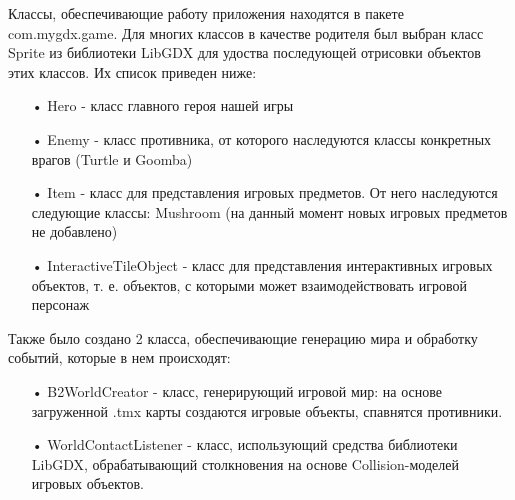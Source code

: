 Классы, обеспечивающие работу приложения находятся в пакете com.mygdx.game. Для многих классов в качестве родителя был выбран класс Sprite из библиотеки LibGDX для удоства последующей отрисовки объектов этих классов. Их список приведен ниже:
\begin{enumerate}
\item[•] Hero - класс главного героя нашей игры
\item[•] Enemy - класс противника, от которого наследуются классы конкретных врагов (Turtle и Goomba)
\item[•] Item - класс для представления игровых предметов. От него наследуются следующие классы: Mushroom (на данный момент новых игровых предметов не добавлено)
\item[•] InteractiveTileObject - класс для представления интерактивных игровых объектов, т. е. объектов, с которыми может взаимодействовать игровой персонаж
\end{enumerate}

Также было создано 2 класса, обеспечивающие генерацию мира и обработку событий, которые в нем происходят:
\begin{enumerate}
\item[•] B2WorldCreator - класс, генерирующий игровой мир: на основе загруженной .tmx карты создаются игровые объекты, спавнятся противники.
\item[•] WorldContactListener - класс, использующий средства библиотеки LibGDX, обрабатывающий столкновения на основе Collision-моделей игровых объектов. 
\end{enumerate}

